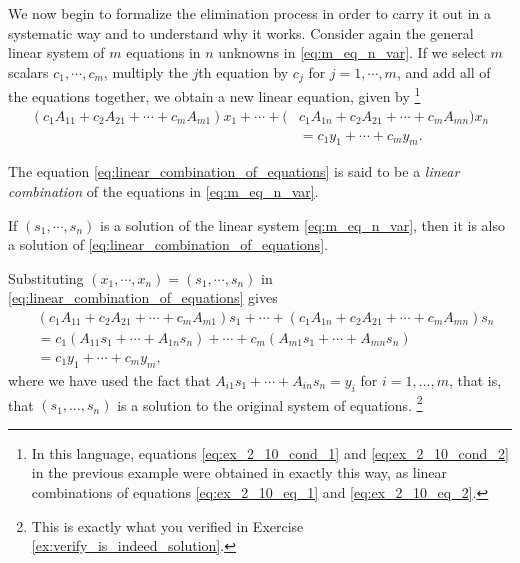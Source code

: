\documentclass[12pt,letterpaper,reqno]{article}
\numberwithin{equation}{section}
\begin{document}
We now begin to formalize the elimination process in order to carry it out in a systematic way and to understand why it works. Consider again the general linear system of $m$ equations in $n$ unknowns in \eqref{eq:m_eq_n_var}. If we select $m$ scalars $c_1,\cdots,c_m$, multiply the $j$th equation by $c_j$ for $j=1,\cdots,m$, and add all of the equations together, we obtain a new linear equation, given by \footnote{In this language, equations \eqref{eq:ex_2_10_cond_1} and \eqref{eq:ex_2_10_cond_2} in the previous example were obtained in exactly this way, as linear combinations of equations \eqref{eq:ex_2_10_eq_1} and \eqref{eq:ex_2_10_eq_2}.}
\begin{equation}\label{eq:linear_combination_of_equations}
	\begin{split}
		(c_1A_{11}+c_2A_{21}+\cdots+c_mA_{m1})x_1+\cdots+(&c_1A_{1n}+c_2A_{21}+\cdots+c_mA_{mn})x_n \\ &= c_1y_1+\cdots +c_m y_m.
	\end{split}
\end{equation}

\begin{defn}\label{def:linear_combination_of_equations}
The equation \eqref{eq:linear_combination_of_equations} is said to be a \emph{linear combination} of the equations in \eqref{eq:m_eq_n_var}.
\end{defn}

\begin{thm}\label{prop:linear_combinations_of_linear_equations_preserve_solutions}
If $(s_1,\cdots,s_n)$ is a solution of the linear system \eqref{eq:m_eq_n_var}, then it is also a solution of \eqref{eq:linear_combination_of_equations}.	
\end{thm}

\begin{pf}
	Substituting $(x_1,\cdots,x_n)=(s_1,\cdots,s_n)$ in \eqref{eq:linear_combination_of_equations} gives
\begin{align*}
	&(c_1A_{11}+c_2A_{21}+\cdots+c_mA_{m1})s_1+\cdots+(c_1A_{1n}+c_2A_{21}+\cdots+c_mA_{mn})s_n  \\
	&=c_1(A_{11}s_1+\cdots + A_{1n}s_n)+\cdots + c_m(A_{m1}s_1+\cdots + A_{mn}s_n) \\
	&= c_1y_1 + \cdots + c_my_m,
\end{align*}
where we have used the fact that $A_{i1}s_1+\cdots + A_{in}s_n=y_i$ for $i=1,\dots,m$, that is, that $(s_1,\dots,s_n)$ is a solution to the original system of equations. \footnote{This is exactly what you verified in Exercise \ref{ex:verify_is_indeed_solution}.}
\end{pf}
\end{document}
